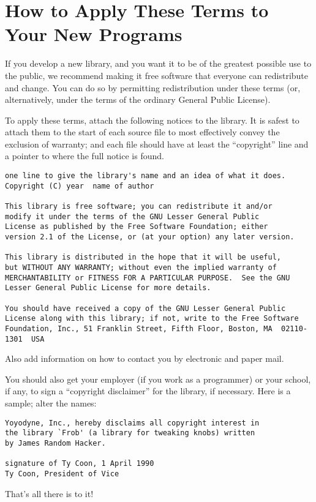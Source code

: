 \section*{How to Apply These Terms to Your New Programs}

If you develop a new library, and you want it to be of the greatest possible
use to the public, we recommend making it free software that everyone can
redistribute and change. You can do so by permitting redistribution under these
terms (or, alternatively, under the terms of the ordinary General Public
License).

To apply these terms, attach the following notices to the library. It is safest
to attach them to the start of each source file to most effectively convey the
exclusion of warranty; and each file should have at least the ``copyright''
line and a pointer to where the full notice is found.

\begin{verbatim}
one line to give the library's name and an idea of what it does.
Copyright (C) year  name of author

This library is free software; you can redistribute it and/or
modify it under the terms of the GNU Lesser General Public
License as published by the Free Software Foundation; either
version 2.1 of the License, or (at your option) any later version.

This library is distributed in the hope that it will be useful,
but WITHOUT ANY WARRANTY; without even the implied warranty of
MERCHANTABILITY or FITNESS FOR A PARTICULAR PURPOSE.  See the GNU
Lesser General Public License for more details.

You should have received a copy of the GNU Lesser General Public
License along with this library; if not, write to the Free Software
Foundation, Inc., 51 Franklin Street, Fifth Floor, Boston, MA  02110-1301  USA
\end{verbatim}

Also add information on how to contact you by electronic and paper mail.

You should also get your employer (if you work as a programmer) or your school,
if any, to sign a ``copyright disclaimer'' for the library, if necessary. Here
is a sample; alter the names:

\begin{verbatim}
Yoyodyne, Inc., hereby disclaims all copyright interest in
the library `Frob' (a library for tweaking knobs) written
by James Random Hacker.

signature of Ty Coon, 1 April 1990
Ty Coon, President of Vice
\end{verbatim}

That's all there is to it!
